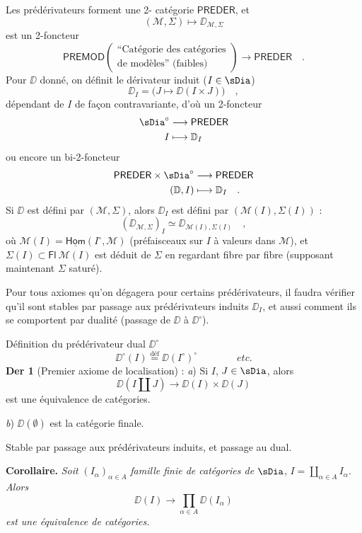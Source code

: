 Les prédérivateurs forment une 2- catégorie $\mathsf{PREDER}$, et
\[ (\mathcal{M},\Sigma) \longmapsto \DD_{\mathcal{M},\Sigma} \]
est un 2-foncteur
\[ \mathsf{PREMOD}
\begin{pmatrix}
\text{“Catégorie des catégories} \\
\text{de modèles” (faibles)}
\end{pmatrix}
\longrightarrow \mathsf{PREDER} \quad . \]
Pour $\DD$ donné, on définit le dérivateur induit ($I \in \sDia$)
\[ \DD_I = \big(J \longmapsto \DD(I \times J)\big) \quad , \]
dépendant de $I$ de façon contravariante, d'où un 2-foncteur
\[ \begin{aligned}
\sDia^\circ &\longrightarrow \mathsf{PREDER} \\
I &\longmapsto \DD_I
\end{aligned} \]
ou encore un bi-2-foncteur
\[ \begin{aligned}
\mathsf{PREDER} \times \sDia^\circ &\longrightarrow \mathsf{PREDER} \\
(\DD, I) &\longmapsto \DD_I \quad .
\end{aligned} \]
Si $\DD$ est défini par $(\mathcal{M},\Sigma)$, alors $\DD_I$ est défini par $(\mathcal{M}(I),\Sigma(I))$ :
\[ (\DD_{\mathcal{M},\Sigma})_I \simeq \DD_{\mathcal{M}(I),\Sigma(I)} \quad , \]
où $\mathcal{M}(I) = \underline{\mathsf{Hom}}(I^\circ,\mathcal{M})$ (préfaisceaux sur $I$ à valeurs dans $\mathcal{M}$), et $\Sigma(I) \subset \mathsf{Fl}\ \mathcal{M}(I)$ est déduit de $\Sigma$ en regardant fibre par fibre (supposant maintenant $\Sigma$ saturé). %

Pour tous axiomes qu'on dégagera pour certains prédérivateurs, il faudra vérifier qu'il sont stables par passage aux prédérivateurs induits $\DD_I$, et aussi comment ils se comportent par dualité (passage de $\DD$ à $\DD^\circ$). %

Définition du prédérivateur dual $\DD^\circ$
\[ \DD^\circ(I) \overset{\text{déf}}{=} \DD(I^\circ)^\circ \qquad\qquad \textit{etc.} \]
\textbf{Der 1} (Premier axiome de localisation) : \textit{a}) Si $I$, $J \in \sDia$, alors
\[ \DD(I \amalg J) \longrightarrow \DD(I) \times \DD(J) \]
est une équivalence de catégories.

\textit{b}) $\DD(\emptyset)$ est la catégorie finale.

Stable par passage aux prédérivateurs induits, et passage au dual.

\textbf{Corollaire.} \textit{Soit} $(I_\alpha)_{\alpha \in A}$ \textit{famille finie de catégories de} $\sDia$, $I = \coprod\limits_{\alpha \in A} I_\alpha$. \textit{Alors}
\[ \DD(I) \longrightarrow \prod_{\alpha \in A} \DD(I_\alpha) \]
\textit{est une équivalence de catégories.}

